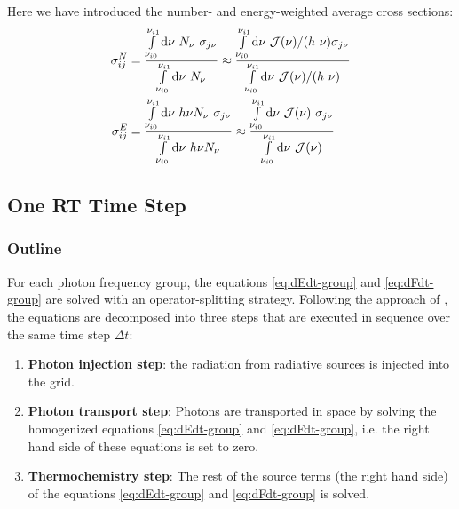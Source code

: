 Here we have introduced the number- and energy-weighted average cross sections:
\begin{align}
\sigma_{ij}^N &=
		\frac{
			\int\limits_{\nu_{i0}}^{\nu_{i1}}\de \nu \ N_\nu \ \sigma_{j\nu}
		} {
		  \int\limits_{\nu_{i0}}^{\nu_{i1}}\de \nu \ N_\nu
		}
		\approx
		\frac{
			\int\limits_{\nu_{i0}}^{\nu_{i1}}\de \nu \ \mathcal{J}(\nu) / (h \ \nu) \sigma_{j\nu}
		} {
  		\int\limits_{\nu_{i0}}^{\nu_{i1}}\de \nu \ \mathcal{J}(\nu) / (h \ \nu)
		} \label{eq:sigma_N}\\
\sigma_{ij}^E &=
		\frac{
			\int\limits_{\nu_{i0}}^{\nu_{i1}}\de \nu \ h \nu N_\nu \ \sigma_{j\nu}
		}	{
			\int\limits_{\nu_{i0}}^{\nu_{i1}}\de \nu \ h \nu N_\nu
		}
		\approx
		\frac{
			\int\limits_{\nu_{i0}}^{\nu_{i1}}\de \nu \ \mathcal{J}(\nu) \  \sigma_{j\nu}
		}	{
			\int\limits_{\nu_{i0}}^{\nu_{i1}}\de \nu \ \mathcal{J}(\nu)
		} \label{eq:sigma_E}
\end{align}








\subsection{One RT Time Step}



\subsubsection{Outline}\label{chap:rt-numerics-outline}


For each photon frequency group, the equations \ref{eq:dEdt-group} and \ref{eq:dFdt-group} are
solved with an operator-splitting strategy. Following the approach of \cite{ramses-rt13}, the
equations are decomposed into three steps that are executed in sequence over the same time step
$\Delta t$:

\begin{enumerate}

\item \textbf{Photon injection step}: the radiation from radiative sources is injected into the
grid.

\item \textbf{Photon transport step}: Photons are transported in space by solving the homogenized
equations \ref{eq:dEdt-group} and \ref{eq:dFdt-group}, i.e. the right hand side of these equations
is set to zero.

\item \textbf{Thermochemistry step}: The rest of the source terms (the right hand side) of the
equations \ref{eq:dEdt-group} and \ref{eq:dFdt-group} is solved.
\end{enumerate}

